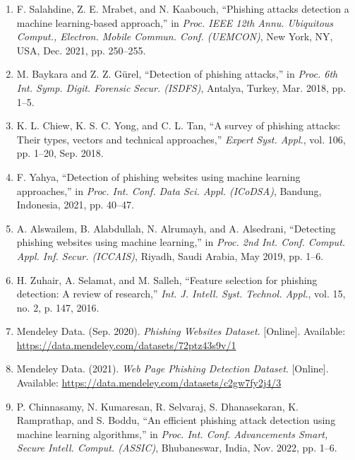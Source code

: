 \documentclass[12pt,a4paper]{report}
\begin{document}
\begin{enumerate}

\item F. Salahdine, Z. E. Mrabet, and N. Kaabouch,
``Phishing attacks detection a machine learning-based approach,''
in \textit{Proc. IEEE 12th Annu. Ubiquitous Comput., Electron. Mobile
Commun. Conf. (UEMCON)}, New York, NY, USA, Dec. 2021, pp. 250--255.

\item M. Baykara and Z. Z. G\"urel,
``Detection of phishing attacks,''
in \textit{Proc. 6th Int. Symp. Digit. Forensic Secur. (ISDFS)},
Antalya, Turkey, Mar. 2018, pp. 1--5.

\item K. L. Chiew, K. S. C. Yong, and C. L. Tan,
``A survey of phishing attacks: Their types, vectors and technical approaches,''
\textit{Expert Syst. Appl.}, vol. 106, pp. 1--20, Sep. 2018.

\item F. Yahya,
``Detection of phishing websites using machine learning approaches,''
in \textit{Proc. Int. Conf. Data Sci. Appl. (ICoDSA)},
Bandung, Indonesia, 2021, pp. 40--47.

\item A. Alswailem, B. Alabdullah, N. Alrumayh, and A. Alsedrani,
``Detecting phishing websites using machine learning,''
in \textit{Proc. 2nd Int. Conf. Comput. Appl. Inf. Secur. (ICCAIS)},
Riyadh, Saudi Arabia, May 2019, pp. 1--6.

\item H. Zuhair, A. Selamat, and M. Salleh,
``Feature selection for phishing detection: A review of research,''
\textit{Int. J. Intell. Syst. Technol. Appl.}, vol. 15, no. 2, p. 147, 2016.

\item Mendeley Data. (Sep. 2020).
\textit{Phishing Websites Dataset}. [Online].
Available: \url{https://data.mendeley.com/datasets/72ptz43s9v/1}

\item Mendeley Data. (2021).
\textit{Web Page Phishing Detection Dataset}. [Online].
Available: \url{https://data.mendeley.com/datasets/c2gw7fy2j4/3}

\item P. Chinnasamy, N. Kumaresan, R. Selvaraj, S. Dhanasekaran,
K. Ramprathap, and S. Boddu,
``An efficient phishing attack detection using machine learning algorithms,''
in \textit{Proc. Int. Conf. Advancements Smart, Secure Intell. Comput. (ASSIC)},
Bhubaneswar, India, Nov. 2022, pp. 1--6.


\end{enumerate}
\end{document}
